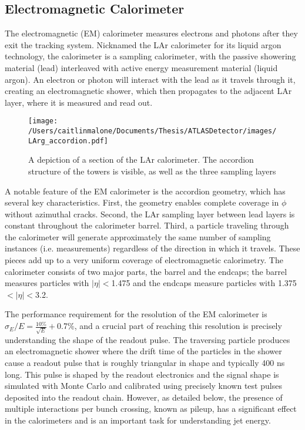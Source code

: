\subsection{Electromagnetic Calorimeter}
\label{sec:em_cal}

The electromagnetic (EM) calorimeter measures electrons and photons after they exit the tracking system.  Nicknamed the LAr calorimeter for its liquid argon technology,  the calorimeter is a sampling calorimeter, with the passive showering material (lead) interleaved with active energy measurement material (liquid argon).  An electron or photon will interact with the lead as it travels through it, creating an electromagnetic shower, which then propagates to the adjacent LAr layer, where it is measured and read out.


\begin{figure}
\begin{center}
	\texttt{[image: /Users/caitlinmalone/Documents/Thesis/ATLASDetector/images/LArg\_accordion.pdf]}		
	\label{fig:lar}
	\caption{A depiction of a section of the LAr calorimeter.  The accordion structure of the towers is visible, as well as the three sampling layers}
\end{center}
\end{figure}


A notable feature of the EM calorimeter is the accordion geometry, which has several key characteristics.  First, the geometry enables complete coverage in $\phi$ without azimuthal cracks.  Second, the LAr sampling layer between lead layers is constant throughout the calorimeter barrel.  Third, a particle traveling through the calorimeter will generate approximately the same number of sampling instances (i.e. measurements) regardless of the direction in which it travels.  These pieces add up to a very uniform coverage of electromagnetic calorimetry.  The calorimeter consists of two major parts, the barrel and the endcaps; the barrel measures particles with $|\eta|<$1.475 and the endcaps measure particles with 1.375$<|\eta|<$3.2.  

The performance requirement for the resolution of the EM calorimeter is $\sigma_E/E=\frac{10\%}{\sqrt{E}}+$0.7\%, and a crucial part of reaching this resolution is precisely understanding the shape of the readout pulse.  The traversing particle produces an electromagnetic shower where the drift time of the particles in the shower cause a readout pulse that is roughly triangular in shape and typically 400 ns long.  This pulse is shaped by the readout electronics and the signal shape is simulated with Monte Carlo and calibrated using precisely known test pulses deposited into the readout chain.  However, as detailed below, the presence of multiple interactions per bunch crossing, known as pileup, has a significant effect in the calorimeters and is an important task for understanding jet energy.

